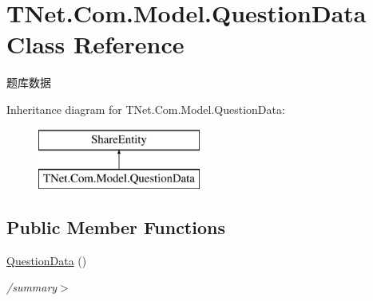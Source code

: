 \hypertarget{class_t_net_1_1_com_1_1_model_1_1_question_data}{}\section{T\+Net.\+Com.\+Model.\+Question\+Data Class Reference}
\label{class_t_net_1_1_com_1_1_model_1_1_question_data}


题库数据  


Inheritance diagram for T\+Net.\+Com.\+Model.\+Question\+Data\+:\begin{figure}[H]
\begin{center}
\leavevmode
\includegraphics[height=2.000000cm]{class_t_net_1_1_com_1_1_model_1_1_question_data}
\end{center}
\end{figure}
\subsection*{Public Member Functions}
\begin{DoxyCompactItemize}
\item 
\mbox{\label{class_t_net_1_1_com_1_1_model_1_1_question_data_ab9e0b3b934cce784cae7fa984b625650}} 
\mbox{\hyperlink{class_t_net_1_1_com_1_1_model_1_1_question_data_ab9e0b3b934cce784cae7fa984b625650}{Question\+Data}} ()
\begin{DoxyCompactList}\small\item\em /summary$>$ \end{DoxyCompactList}\end{DoxyCompactItemize}
